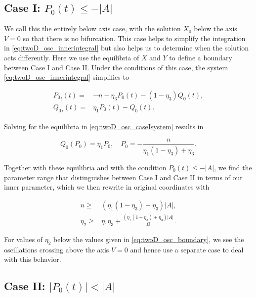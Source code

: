 \subsection{Case I: $P_0(t)\le -|A|$}
\label{subsec:twoD_highfreqosc_caseI}

We call this the entirely below axis case, with the solution $X_0$ below the axis $V=0$ so that there is no bifurcation. This case helps to simplify the integration in \eqref{eq:twoD_osc_innerintegral} but also helps us to determine when the solution acts differently. Here we use the equilibria of $X$ and $Y$ to define a boundary between Case I and Case II. Under the conditions of this case, the system \eqref{eq:twoD_osc_innerintegral} simplifies to

\begin{equation}\label{eq:twoD_osc_caseIsystem}
\begin{aligned}
{P_0}_t(t) =& -n -\eta_3P_0(t)-(1-\eta_3)Q_0(t),\\
{Q_0}_t(t) =& \eta_1P_0(t)-Q_0(t).
\end{aligned}
\end{equation}

Solving for the equilibria in \eqref{eq:twoD_osc_caseIsystem} results in

\begin{equation*}
Q_0(P_0)=\eta_1P_0,\quad P_0=-\frac{n}{\eta_1(1-\eta_3)+\eta_3}. 
\end{equation*}

Together with these equilibria and with the condition $P_0(t)\le -|A|$, we find the parameter range that distinguishes between Case I and Case II in terms of our inner parameter, which we then rewrite in original coordinates with

\begin{equation}\label{eq:twoD_osc_boundary}
\begin{aligned}
n\ge& (\eta_1(1-\eta_3)+\eta_3)|A|,\\
\eta_2\ge&\eta_1\eta_3+ \frac{(\eta_1(1-\eta_3)+\eta_3)|A|}{\Omega}.
\end{aligned}
\end{equation}

For values of $\eta_2$ below the values given in \eqref{eq:twoD_osc_boundary}, we see the oscillations crossing above the axis $V=0$ and hence use a separate case to deal with this behavior.

\subsection{Case II: $|P_0(t)|<|A|$}
\label{subsec:twoD_highfreqosc_caseII}

